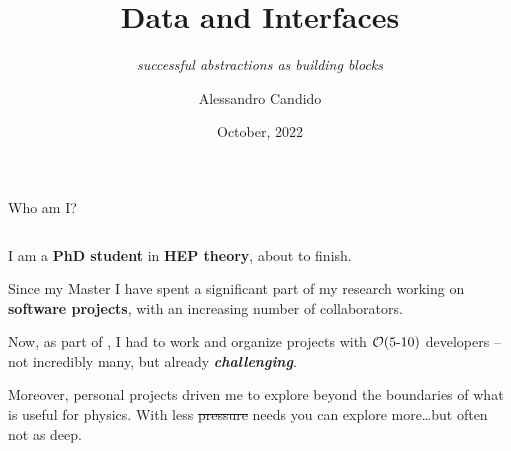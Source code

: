 \documentclass[9pt]{beamer}
\title{Data and Interfaces}
\subtitle{
    \itshape
    successful abstractions as building blocks
}
\date{October, 2022}
\author{Alessandro Candido}
\begin{document}
\maketitle



\begin{frame}{Who am I?}
    \begin{columns}
        \begin{column}{0.5\textwidth}
            I am a \textbf{PhD student} in \textbf{HEP theory}, about to
            finish.\newline

            Since my Master I have spent a significant part of my research
            working on \alert{\textbf{software projects}}, with an increasing
            number of collaborators.\newline

            \vspace*{5pt}
            \vspace*{5pt}

            Now, as part of \nnpdf{}, I had to work and organize projects with
            $\order{5\text{-}10}$ developers -- not incredibly many, but already
            \textit{\textbf{challenging}}.\newline

            Moreover, personal projects driven me to explore beyond the
            boundaries of what is useful for physics.
            With less \sout{pressure} needs you can explore more\dots but often
            not as deep.\newline

            \vspace*{5pt}
            \vspace*{5pt}


\end{column}
\end{columns}
\end{frame}
\end{document}
